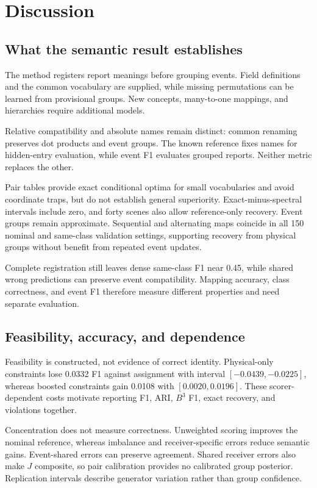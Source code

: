 \section{Discussion}\label{sec:discussion}
\subsection{What the semantic result establishes}
The method registers report meanings before grouping events. Field definitions and the common vocabulary are supplied, while missing permutations can be learned from provisional groups. New concepts, many-to-one mappings, and hierarchies require additional models.

Relative compatibility and absolute names remain distinct: common renaming preserves dot products and event groups. The known reference fixes names for hidden-entry evaluation, while event F1 evaluates grouped reports. Neither metric replaces the other.

Pair tables provide exact conditional optima for small vocabularies and avoid coordinate traps, but do not establish general superiority. Exact-minus-spectral intervals include zero, and forty scenes also allow reference-only recovery. Event groups remain approximate. Sequential and alternating maps coincide in all 150 nominal and same-class validation settings, supporting recovery from physical groups without benefit from repeated event updates.

Complete registration still leaves dense same-class F1 near 0.45, while shared wrong predictions can preserve event compatibility. Mapping accuracy, class correctness, and event F1 therefore measure different properties and need separate evaluation.

\subsection{Feasibility, accuracy, and dependence}
Feasibility is constructed, not evidence of correct identity. Physical-only constraints lose 0.0332 F1 against assignment with interval $[-0.0439,-0.0225]$, whereas boosted constraints gain 0.0108 with $[0.0020,0.0196]$. These scorer-dependent costs motivate reporting F1, ARI, $B^3$ F1, exact recovery, and violations together.

Concentration does not measure correctness. Unweighted scoring improves the nominal reference, whereas imbalance and receiver-specific errors reduce semantic gains. Event-shared errors can preserve agreement. Shared receiver errors also make $J$ composite, so pair calibration provides no calibrated group posterior. Replication intervals describe generator variation rather than group confidence.

